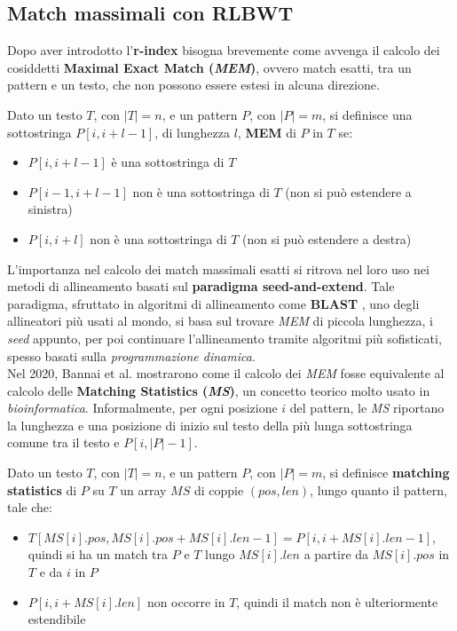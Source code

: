 \subsection{Match massimali con RLBWT}
Dopo aver introdotto l'\textbf{r-index} bisogna brevemente come avvenga il
calcolo dei cosiddetti \textbf{Maximal Exact Match
  (\textit{MEM})}, ovvero match esatti, tra un pattern e un testo, che non
possono essere estesi in alcuna direzione.
\begin{definizione}
  Dato un testo $T$, con $|T|=n$, e un pattern $P$, con $|P|=m$, si definisce
  una sottostringa $P[i,i+l-1]$, di lunghezza $l$, \textbf{MEM} di $P$ in $T$
  se:
  \begin{itemize}
    \item $P[i,i+l-1]$ è una sottostringa di $T$
    \item $P[i-1,i+l-1]$ non è una sottostringa di $T$ (non si può estendere a
    sinistra) 
    \item $P[i,i+l]$ non è una sottostringa di $T$ (non si può estendere a
    destra) 
  \end{itemize}
\end{definizione}
L'importanza nel calcolo dei match massimali esatti si ritrova nel loro uso nei
metodi di allineamento basati sul \textbf{paradigma seed-and-extend}.
Tale paradigma, sfruttato in algoritmi di allineamento come \textbf{BLAST}
\cite{blast}, uno degli allineatori più usati al mondo, si basa sul trovare
\textit{MEM} di piccola lunghezza, i \textit{seed} appunto, per poi continuare
l'allineamento tramite algoritmi più sofisticati, spesso basati sulla
\textit{programmazione dinamica}. \\
Nel 2020, Bannai et al. \cite{bannai} mostrarono come il calcolo dei
\textit{MEM} fosse equivalente al calcolo delle \textbf{Matching Statistics
  (\textit{MS})}, un concetto teorico molto usato in
\textit{bioinformatica}. Informalmente, per ogni posizione $i$ del pattern, le
\textit{MS} riportano la lunghezza e 
una posizione di inizio sul testo della più lunga sottostringa comune tra il
testo e $P[i, |P|-1]$. 
\begin{definizione}
  Dato un testo $T$, con $|T|=n$, e un pattern $P$, con $|P|=m$, si definisce
  \textbf{matching statistics} di $P$ su $T$ un array $MS$ di coppie $(pos,
  len)$, lungo quanto il pattern, tale che:
  \begin{itemize}
    \item $T[MS[i].pos,MS[i].pos+MS[i].len-1]=P[i,i+MS[i].len-1]$, quindi si ha
    un match tra $P$ e $T$ lungo $MS[i].len$ a partire da $MS[i].pos$ in $T$ e
    da $i$ in $P$
    \item $P[i,i+MS[i].len]$ non occorre in $T$, quindi il match non è
    ulteriormente estendibile 
  \end{itemize}
\end{definizione}
